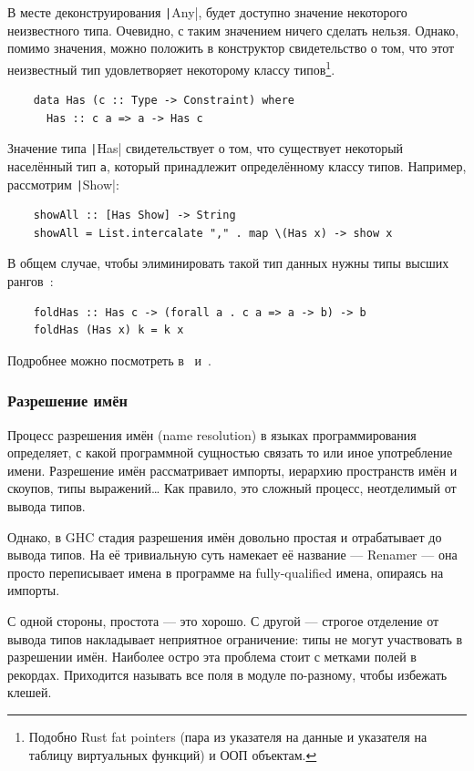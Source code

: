В месте деконструирования \texttt|Any|, будет доступно значение некоторого неизвестного типа.
Очевидно, с таким значением ничего сделать нельзя.
Однако, помимо значения, можно положить в конструктор свидетельство о том, что этот неизвестный тип удовлетворяет некоторому классу типов\footnote{Подобно Rust fat pointers (пара из указателя на данные и указателя на таблицу виртуальных функций) и ООП объектам.}.
\begin{verbatim}
    data Has (c :: Type -> Constraint) where
      Has :: c a => a -> Has c
\end{verbatim}

Значение типа \texttt|Has| свидетельствует о том, что существует некоторый населённый тип \texttt{a}, который принадлежит определённому классу типов.
Например, рассмотрим \texttt|Show|:
\begin{verbatim}
    showAll :: [Has Show] -> String
    showAll = List.intercalate "," . map \(Has x) -> show x
\end{verbatim}

В общем случае, чтобы элиминировать такой тип данных нужны типы высших рангов~\cite[глава 24.3]{pierce2002types}:
\begin{verbatim}
    foldHas :: Has c -> (forall a . c a => a -> b) -> b
    foldHas (Has x) k = k x
\end{verbatim}

Подробнее можно посмотреть в~\cite[глава 7]{maguire-types} и~\cite[глава 24]{pierce2002types}.

\subsubsection{Разрешение имён} \label{subsubsec:resolve}

Процесс разрешения имён (name resolution) в языках программирования определяет, с какой программной сущностью связать то или иное употребление имени.
Разрешение имён рассматривает импорты, иерархию пространств имён и скоупов, типы выражений\ldots
Как правило, это сложный процесс, неотделимый от вывода типов.

Однако, в GHC стадия разрешения имён довольно простая и отрабатывает до вывода типов.
На её тривиальную суть намекает её название --- Renamer --- она просто переписывает имена в программе на fully-qualified имена, опираясь на импорты.

С одной стороны, простота --- это хорошо.
С другой --- строгое отделение от вывода типов накладывает неприятное ограничение: типы не могут участвовать в разрешении имён.
Наиболее остро эта проблема стоит с метками полей в рекордах.
Приходится называть все поля в модуле по-разному, чтобы избежать клешей.

